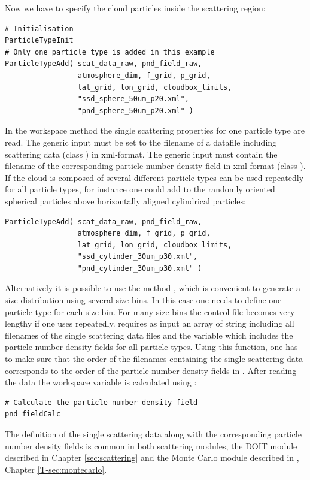 Now we have to specify the cloud particles inside the scattering
region:
\begin{verbatim}
# Initialisation
ParticleTypeInit
# Only one particle type is added in this example 
ParticleTypeAdd( scat_data_raw, pnd_field_raw,
                 atmosphere_dim, f_grid, p_grid,
                 lat_grid, lon_grid, cloudbox_limits,
                 "ssd_sphere_50um_p20.xml",
                 "pnd_sphere_50um_p20.xml" )
\end{verbatim}
In the workspace method  the single
scattering properties for one particle type are read. The
generic input  must be set to
the filename of a datafile including scattering data (class
) in xml-format. The generic input
 must contain the filename of the
corresponding particle number density field in xml-format (class
). If the cloud is composed of several
different particle types  can be used
repeatedly for all particle types, for instance one could add to the
randomly oriented spherical particles above horizontally aligned
cylindrical particles:
\begin{verbatim}
ParticleTypeAdd( scat_data_raw, pnd_field_raw,
                 atmosphere_dim, f_grid, p_grid,
                 lat_grid, lon_grid, cloudbox_limits,
                 "ssd_cylinder_30um_p30.xml",
                 "pnd_cylinder_30um_p30.xml" )
\end{verbatim}
Alternatively it is possible to use the method
, which is convenient to generate a size
distribution using several size bins. In this case one needs to define
one
particle type for each size bin. For many size bins the control file
becomes very lengthy if one uses 
repeatedly.  requires as input an array
of string including all filenames of the single scattering data files
and the variable  which includes the particle
number density fields for all particle types. Using this function, one
has to make sure that the order of the filenames containing the single
scattering data corresponds to the order of the particle number
density fields in .
After reading the data the workspace variable  is
calculated using : 
\begin{verbatim}
# Calculate the particle number density field
pnd_fieldCalc
\end{verbatim}

The definition of the single scattering data along with the
corresponding particle number density fields is common in both
scattering modules, the DOIT module described in 
Chapter \ref{sec:scattering} and the Monte Carlo module described in
\theory, Chapter \ref{T-sec:montecarlo}.



